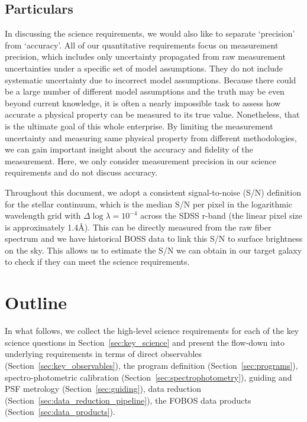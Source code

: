 \documentclass[11pt,a4paper,twoside,onecolumn,openany,final,oldfontcommands]{memoir}
\begin{document}
\subsection{Particulars}

 In discussing the science requirements, we would also like to separate `precision' from `accuracy'. All of our quantitative requirements focus on measurement precision, which includes only uncertainty propagated from raw measurement uncertainties under a specific set of model assumptions. They do not include systematic uncertainty due to incorrect model assumptions. Because there could be a large number of different model assumptions and the truth may be even beyond current knowledge, it is often a nearly impossible task to assess how accurate a physical property can be measured to its true value. Nonetheless, that is the ultimate goal of this whole enterprise. By limiting the measurement uncertainty and measuring same physical property from different methodologies, we can gain important insight about the accuracy and fidelity of the measurement. Here, we only consider measurement precision in our science requirements and do not discuss accuracy.

Throughout this document, we adopt a consistent signal-to-noise (S/N) definition for the stellar continuum, which is the median S/N per pixel in the logarithmic wavelength grid with $\Delta \log \lambda = 10^{-4}$ across the SDSS r-band (the linear pixel size is approximately 1.4\AA). This can be directly measured from the raw fiber spectrum and we have historical BOSS data to link this S/N to surface brightness on the sky. This allows us to estimate the S/N we can obtain in our target galaxy to check if they can meet the science requirements.

\section{Outline}

In what follows, we collect the high-level science requirements for each of the key science questions in Section~\ref{sec:key_science} and present the flow-down into underlying requirements in terms of direct observables (Section~\ref{sec:key_observables}), the program definition (Section~\ref{sec:programs}), spectro-photometric calibration (Section~\ref{sec:spectrophotometry}), guiding and PSF metrology (Section~\ref{sec:guiding}), data reduction (Section~\ref{sec:data_reduction_pipeline}), the FOBOS data products (Section~\ref{sec:data_products}).
\end{document}
